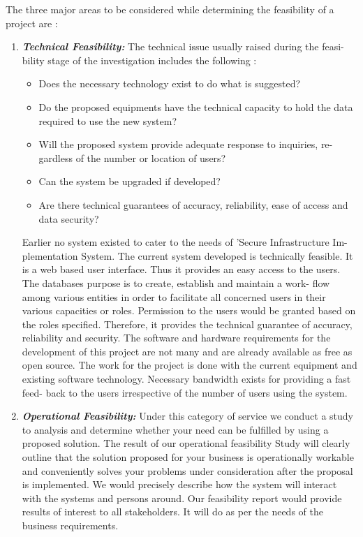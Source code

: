The three major areas to be considered while determining the feasibility of a
project are :
\begin{enumerate}
\item \textbf{\emph{Technical Feasibility:}} The technical issue usually raised during the feasi-
bility stage of the investigation includes the following :
\begin{itemize}
\item Does the necessary technology exist to do what is suggested?
\item Do the proposed equipments have the technical capacity to hold the
data required to use the new system?
\item Will the proposed system provide adequate response to inquiries, re-
gardless of the number or location of users?
\item Can the system be upgraded if developed?
\item Are there technical guarantees of accuracy, reliability, ease of access
and data security?
\end{itemize}

Earlier no system existed to cater to the needs of ’Secure Infrastructure Im-
plementation System. The current system developed is technically feasible.
It is a web based user interface. Thus it provides an easy access to the
users. The databases purpose is to create, establish and maintain a work-
flow among various entities in order to facilitate all concerned users in their
various capacities or roles. Permission to the users would be granted based
on the roles specified.
Therefore, it provides the technical guarantee of accuracy, reliability and
security. The software and hardware requirements for the development of
this project are not many and are already available as free as open source.
The work for the project is done with the current equipment and existing
software technology. Necessary bandwidth exists for providing a fast feed-
back to the users irrespective of the number of users using the system.

\item \textbf{\emph{Operational Feasibility:}} Under this category of service we conduct a study to analysis and determine whether your need can be fulfilled by using a proposed solution. The result of our operational feasibility Study will clearly outline that the solution proposed for your business is operationally workable and conveniently solves your problems under consideration after the proposal is implemented. We would precisely describe how the system will interact with the systems and persons around. Our feasibility report would provide results of interest to all stakeholders. It will do as per the needs of the business requirements.


\end{enumerate}
